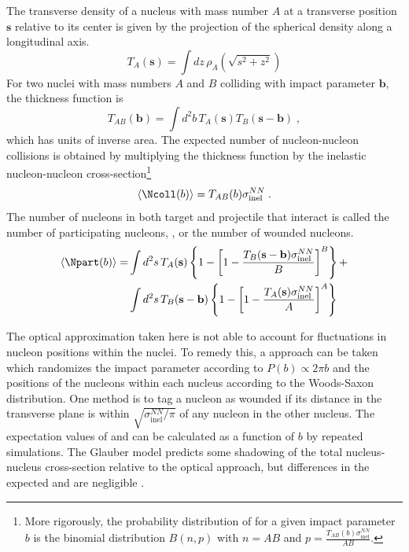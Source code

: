 The transverse density of a nucleus with mass number $A$ at a transverse position $\mathbf{s}$ relative to its center is given by the projection of the spherical density along a longitudinal axis.
\begin{equation}
T_A(\mathbf{s}) = \int dz \, \rho_A\left( \sqrt{s^2 + z^2} \right)
\end{equation}
For two nuclei with mass numbers $A$ and $B$ colliding with impact parameter $\mathbf{b}$, the thickness function is
\begin{equation}
T_{AB}(\mathbf{b}) = \int d^2 b \, T_A(\mathbf{s}) T_B(\mathbf{s} - \mathbf{b}) \;,
\end{equation}
which has units of inverse area.
The expected number of nucleon-nucleon collisions \Ncoll is obtained by multiplying the thickness function by the inelastic nucleon-nucleon cross-section\footnote{More rigorously, the probability distribution of \Ncoll for a given impact parameter $b$ is the binomial distribution $B(n,p)$ with $n = AB$ and $p = \frac{T_{AB}(b) \sigma^{NN}_\mathrm{inel}}{AB}$. }
\begin{equation}
  \langle\Ncoll(b)\rangle = T_{AB}(b) \sigma^{NN}_\mathrm{inel} \;.
\end{equation}
The number of nucleons in both target and projectile that interact is called the number of participating nucleons, \Npart, or the number of wounded nucleons.
\begin{equation}
  \begin{split}
  \langle \Npart(b) \rangle = &\int d^2 s \, T_A(\mathbf{s})\left\{ 1 - \left[ 1 - \frac{T_B (\mathbf{s} - \mathbf{b}) \sigma^{NN}_\mathrm{inel}}{B} \right]^B \right\} + \\
  &\int d^2 s \, T_B(\mathbf{s}-\mathbf{b})\left\{ 1 - \left[ 1 - \frac{T_A (\mathbf{s}) \sigma^{NN}_\mathrm{inel}}{A} \right]^A \right\}
  \end{split}
\end{equation}

The optical approximation taken here is not able to account for fluctuations in nucleon positions within the nuclei.
To remedy this, a \mc approach can be taken which randomizes the impact parameter according to $P(b) \propto 2\pi b$ and the positions of the nucleons within each nucleus according to the Woods-Saxon distribution.
One method is to tag a nucleon as wounded if its distance in the transverse plane is within $\sqrt{\sigma^{NN}_\mathrm{inel}/\pi}$ of any nucleon in the other nucleus.
The expectation values of \Ncoll and \Npart can be calculated as a function of $b$ by repeated simulations. 
The Glauber \mc model predicts some shadowing of the total nucleus-nucleus cross-section relative to the optical approach, but differences in the expected \Ncoll and \Npart are negligible \cite{Miller:2007ri}. %

